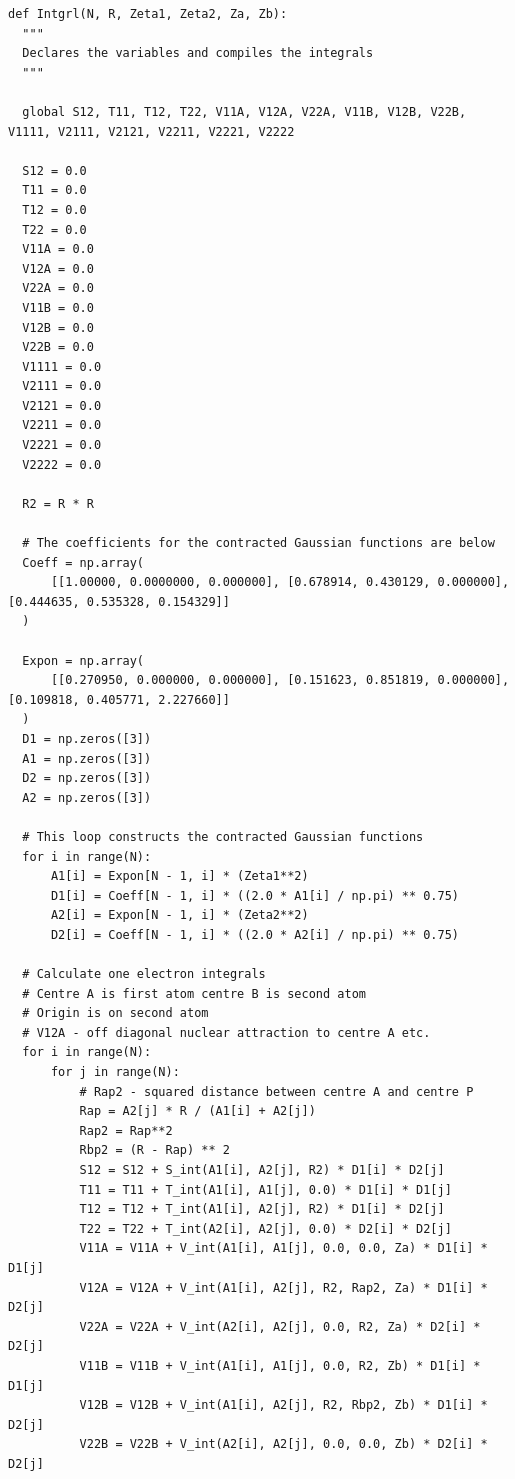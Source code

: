 \begin{lstlisting}[style=MyPython]
def Intgrl(N, R, Zeta1, Zeta2, Za, Zb):
  """
  Declares the variables and compiles the integrals
  """

  global S12, T11, T12, T22, V11A, V12A, V22A, V11B, V12B, V22B, V1111, V2111, V2121, V2211, V2221, V2222

  S12 = 0.0
  T11 = 0.0
  T12 = 0.0
  T22 = 0.0
  V11A = 0.0
  V12A = 0.0
  V22A = 0.0
  V11B = 0.0
  V12B = 0.0
  V22B = 0.0
  V1111 = 0.0
  V2111 = 0.0
  V2121 = 0.0
  V2211 = 0.0
  V2221 = 0.0
  V2222 = 0.0

  R2 = R * R

  # The coefficients for the contracted Gaussian functions are below
  Coeff = np.array(
      [[1.00000, 0.0000000, 0.000000], [0.678914, 0.430129, 0.000000], [0.444635, 0.535328, 0.154329]]
  )

  Expon = np.array(
      [[0.270950, 0.000000, 0.000000], [0.151623, 0.851819, 0.000000], [0.109818, 0.405771, 2.227660]]
  )
  D1 = np.zeros([3])
  A1 = np.zeros([3])
  D2 = np.zeros([3])
  A2 = np.zeros([3])

  # This loop constructs the contracted Gaussian functions
  for i in range(N):
      A1[i] = Expon[N - 1, i] * (Zeta1**2)
      D1[i] = Coeff[N - 1, i] * ((2.0 * A1[i] / np.pi) ** 0.75)
      A2[i] = Expon[N - 1, i] * (Zeta2**2)
      D2[i] = Coeff[N - 1, i] * ((2.0 * A2[i] / np.pi) ** 0.75)

  # Calculate one electron integrals
  # Centre A is first atom centre B is second atom
  # Origin is on second atom
  # V12A - off diagonal nuclear attraction to centre A etc.
  for i in range(N):
      for j in range(N):
          # Rap2 - squared distance between centre A and centre P
          Rap = A2[j] * R / (A1[i] + A2[j])
          Rap2 = Rap**2
          Rbp2 = (R - Rap) ** 2
          S12 = S12 + S_int(A1[i], A2[j], R2) * D1[i] * D2[j]
          T11 = T11 + T_int(A1[i], A1[j], 0.0) * D1[i] * D1[j]
          T12 = T12 + T_int(A1[i], A2[j], R2) * D1[i] * D2[j]
          T22 = T22 + T_int(A2[i], A2[j], 0.0) * D2[i] * D2[j]
          V11A = V11A + V_int(A1[i], A1[j], 0.0, 0.0, Za) * D1[i] * D1[j]
          V12A = V12A + V_int(A1[i], A2[j], R2, Rap2, Za) * D1[i] * D2[j]
          V22A = V22A + V_int(A2[i], A2[j], 0.0, R2, Za) * D2[i] * D2[j]
          V11B = V11B + V_int(A1[i], A1[j], 0.0, R2, Zb) * D1[i] * D1[j]
          V12B = V12B + V_int(A1[i], A2[j], R2, Rbp2, Zb) * D1[i] * D2[j]
          V22B = V22B + V_int(A2[i], A2[j], 0.0, 0.0, Zb) * D2[i] * D2[j]


\end{lstlisting}
